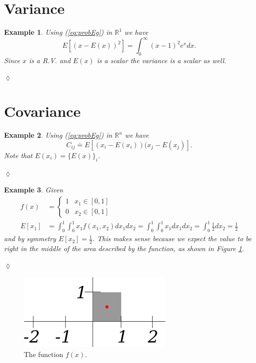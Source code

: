 \documentclass[lecture,12pt,]{pcms-l}
\theoremstyle{example}
\newtheorem{example}{Example}[section]
\begin{document}
\section{Variance}
\begin{example}
Using (\ref{eq:probEg}) in $\mathbb{R}^1$ we have
$$E[(x - E(x))^2] = \int_0^\infty (x-1)^2e^xdx.$$
Since $x$ is a R.V. and $E(x)$ is a scalar the variance is a scalar as well.
\end{example}
$\lozenge$

\section{Covariance}
\begin{example}
Using (\ref{eq:probEg}) in $\mathbb{R}^n$ we have $$C_{ij} \doteq E[(x_i - E(x_i))(x_j - E(x_j)].$$ Note that $E(x_i) = \lbrace E(x) \rbrace_i$.
\end{example}
$\lozenge$

\begin{example}
Given
\begin{align*}
f(x) &= \begin{cases} 1 & x_1 \in [0,1] \\ 0 & x_2 \in [0,1] \end{cases} \\
E[x_1] &= \int_0^1 \int_0^1 x_1f(x_1,x_2)dx_1dx_2 = \int_0^1 \int_0^1 x_1dx_1dx_2 = \int_0^1 \frac{1}{2}dx_2 = \frac{1}{2}
\end{align*}
and by symmetry $E[x_2] = \frac{1}{2}$. This makes sense because we expect the value to be right in the middle of the area described by the function, as shown in Figure \ref{fig:01box}.
\end{example}
$\lozenge$
\begin{figure}[ht!]
	\centering
	\includegraphics[width=.45\textwidth]{images/01box}
	\caption{The function $f(x)$.}
	\label{fig:01box}
\end{figure}
\end{document}
